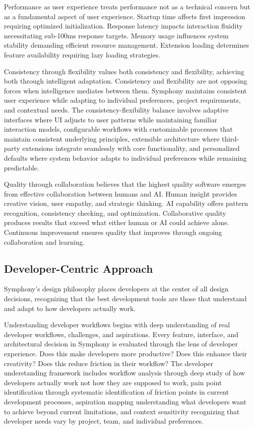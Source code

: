 Performance as user experience treats performance not as a technical concern but as a fundamental aspect of user experience. Startup time affects first impression requiring optimized initialization. Response latency impacts interaction fluidity necessitating sub-100ms response targets. Memory usage influences system stability demanding efficient resource management. Extension loading determines feature availability requiring lazy loading strategies.

Consistency through flexibility values both consistency and flexibility, achieving both through intelligent adaptation. Consistency and flexibility are not opposing forces when intelligence mediates between them. Symphony maintains consistent user experience while adapting to individual preferences, project requirements, and contextual needs. The consistency-flexibility balance involves adaptive interfaces where UI adjusts to user patterns while maintaining familiar interaction models, configurable workflows with customizable processes that maintain consistent underlying principles, extensible architecture where third-party extensions integrate seamlessly with core functionality, and personalized defaults where system behavior adapts to individual preferences while remaining predictable.

Quality through collaboration believes that the highest quality software emerges from effective collaboration between humans and AI. Human insight provides creative vision, user empathy, and strategic thinking. AI capability offers pattern recognition, consistency checking, and optimization. Collaborative quality produces results that exceed what either human or AI could achieve alone. Continuous improvement ensures quality that improves through ongoing collaboration and learning.

\subsection{Developer-Centric Approach}

Symphony's design philosophy places developers at the center of all design decisions, recognizing that the best development tools are those that understand and adapt to how developers actually work.

Understanding developer workflows begins with deep understanding of real developer workflows, challenges, and aspirations. Every feature, interface, and architectural decision in Symphony is evaluated through the lens of developer experience. Does this make developers more productive? Does this enhance their creativity? Does this reduce friction in their workflow? The developer understanding framework includes workflow analysis through deep study of how developers actually work not how they are supposed to work, pain point identification through systematic identification of friction points in current development processes, aspiration mapping understanding what developers want to achieve beyond current limitations, and context sensitivity recognizing that developer needs vary by project, team, and individual preferences.

